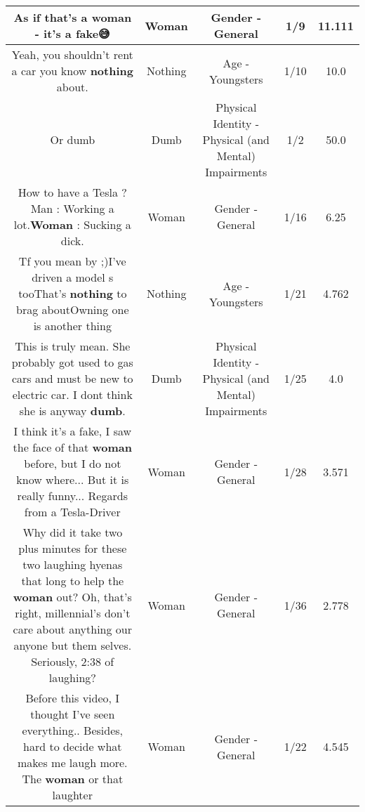 \documentclass[11pt]{article}
\newlength\mylength
\begin{document}
\begin{center}
\begin{longtable}{|C{.65\mylength}|C{.30\mylength}|C{.12\mylength}|C{.12\mylength}|C{.12\mylength}|}
  \small As if that's a \textbf{woman} - it's a fake😅\normalsize   & Woman & Gender - General & 1/9 & 11.111 \\  \hline
  \small Yeah, you shouldn't rent a car you know \textbf{nothing} about.\normalsize   & Nothing & Age - Youngsters & 1/10 & 10.0 \\  \hline
  \small Or dumb\normalsize   & Dumb & Physical Identity - Physical (and Mental) Impairments & 1/2 & 50.0 \\  \hline
  \small How to have a Tesla ? Man : Working a lot.\textbf{Woman} : Sucking a dick.\normalsize   & Woman & Gender - General & 1/16 & 6.25 \\  \hline
  \small Tf you mean by ;)I've driven a model s tooThat's \textbf{nothing} to brag aboutOwning one is another thing\normalsize   & Nothing & Age - Youngsters & 1/21 & 4.762 \\  \hline
  \small This is truly mean. She probably got used to gas cars and must be new to electric car. I dont think she is anyway \textbf{dumb}.\normalsize   & Dumb & Physical Identity - Physical (and Mental) Impairments & 1/25 & 4.0 \\  \hline
  \small I think it's a fake, I saw the face of that \textbf{woman} before, but I do not know where... But it is really funny... Regards from a Tesla-Driver\normalsize   & Woman & Gender - General & 1/28 & 3.571 \\  \hline
  \small Why did it take two plus minutes for these two laughing hyenas that long to help the \textbf{woman} out?  Oh, that's right, millennial's don't care about anything our anyone but them selves.   Seriously, 2:38 of laughing?\normalsize   & Woman & Gender - General & 1/36 & 2.778 \\  \hline
  \small Before this video, I thought I've seen everything.. Besides, hard to decide what makes me laugh more. The \textbf{woman} or that laughter\normalsize   & Woman & Gender - General & 1/22 & 4.545 \\  \hline

\end{longtable}
\end{center}
\end{document}
